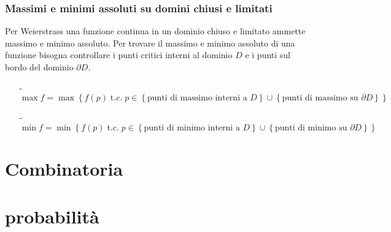 \documentclass[a4paper]{article}
\newcommand\tc{\text{t.c.}}   %
\begin{document}
\subsubsection*{Massimi e minimi assoluti su domini chiusi e limitati}
Per Weierstrass una funzione continua in un dominio chiuso e limitato ammette massimo e minimo assoluto. Per trovare il massimo e minimo
assoluto di una funzione bisogna controllare i punti critici interni al dominio \(D\) e i punti sul bordo del dominio \(\partial D\).

\begin{itemize}[topsep=3pt, itemsep=0pt]
	\item[-] \(\max f = \max \left\{ f(p) \; \tc \; p \in \left\{\text{punti di massimo interni a } D\right\} \cup \left\{\text{punti di massimo su } \partial D \right\} \right\}\)
	\item[-] \(\min f = \min \left\{ f(p) \; \tc \; p \in \left\{\text{punti di minimo interni a } D\right\} \cup \left\{\text{punti di minimo su } \partial D \right\} \right\}\)
\end{itemize}

\newpage



\section{Combinatoria}


\section{probabilità}
\end{document}
